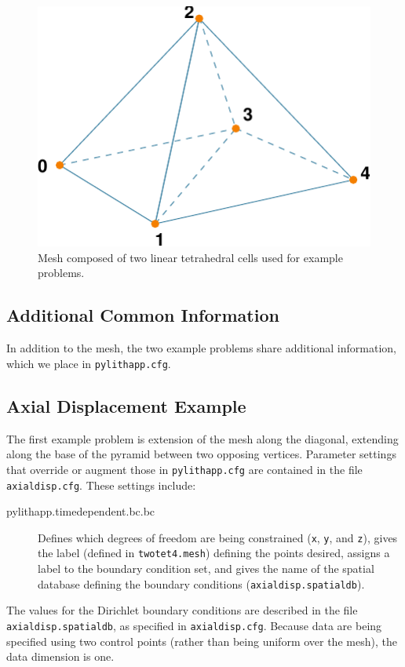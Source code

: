 \noindent \begin{center}
\begin{figure}
\begin{centering}
\includegraphics{tutorials/twocells/figs/twotet4-mesh}
\par\end{centering}

\caption{Mesh composed of two linear tetrahedral cells used for example problems.\label{fig:twotet4-mesh}}
\end{figure}

\par\end{center}


\subsection{Additional Common Information}

In addition to the mesh, the two example problems share additional
information, which we place in \texttt{pylithapp.cfg}.


\subsection{Axial Displacement Example}

The first example problem is extension of the mesh along the diagonal,
extending along the base of the pyramid between two opposing vertices.
Parameter settings that override or augment those in \texttt{pylithapp.cfg}
are contained in the file \texttt{axialdisp.cfg}. These settings include:
\begin{description}
\item [{pylithapp.timedependent.bc.bc}] Defines which degrees of freedom
are being constrained (\texttt{x}, \texttt{y}, and \texttt{z}), gives
the label (defined in \texttt{twotet4.mesh}) defining the points desired,
assigns a label to the boundary condition set, and gives the name
of the spatial database defining the boundary conditions (\texttt{axialdisp.spatialdb}).
\end{description}
The values for the Dirichlet boundary conditions are described in
the file \texttt{axialdisp.spatialdb}, as specified in \texttt{axialdisp.cfg}.
Because data are being specified using two control points (rather
than being uniform over the mesh), the data dimension is one.

